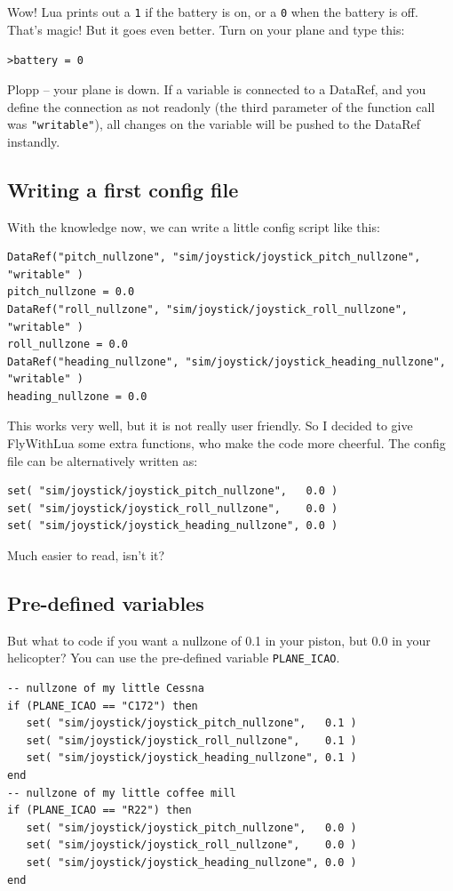 \documentclass[11pt,parskip=half,a4paper]{scrartcl}
\begin{document}
Wow! Lua prints out a \verb|1| if the battery is on, or a \verb|0| when the battery is off. That's magic! But it goes even better. Turn on your plane and type this:

\verb|>battery = 0|

Plopp -- your plane is down. If a variable is connected to a DataRef, and you define the connection as not readonly (the third parameter of the function call was \verb|"writable"|),
all changes on the variable will be pushed to the DataRef instandly.

\subsection{Writing a first config file}

With the knowledge now, we can write a little config script like this:

\begin{lstlisting}
DataRef("pitch_nullzone", "sim/joystick/joystick_pitch_nullzone", "writable" )
pitch_nullzone = 0.0
DataRef("roll_nullzone", "sim/joystick/joystick_roll_nullzone", "writable" )
roll_nullzone = 0.0
DataRef("heading_nullzone", "sim/joystick/joystick_heading_nullzone", "writable" )
heading_nullzone = 0.0
\end{lstlisting}

This works very well, but it is not really user friendly. So I decided to give FlyWithLua some extra functions, who make the code more cheerful. The config file can be alternatively written as:

\begin{lstlisting}
set( "sim/joystick/joystick_pitch_nullzone",   0.0 )
set( "sim/joystick/joystick_roll_nullzone",    0.0 )
set( "sim/joystick/joystick_heading_nullzone", 0.0 )
\end{lstlisting}

Much easier to read, isn't it?

\subsection{Pre-defined variables}

But what to code if you want a nullzone of 0.1 in your piston, but 0.0 in your helicopter? You can use the pre-defined variable \verb|PLANE_ICAO|.

\begin{lstlisting}
-- nullzone of my little Cessna
if (PLANE_ICAO == "C172") then
   set( "sim/joystick/joystick_pitch_nullzone",   0.1 )
   set( "sim/joystick/joystick_roll_nullzone",    0.1 )
   set( "sim/joystick/joystick_heading_nullzone", 0.1 )
end
-- nullzone of my little coffee mill
if (PLANE_ICAO == "R22") then
   set( "sim/joystick/joystick_pitch_nullzone",   0.0 )
   set( "sim/joystick/joystick_roll_nullzone",    0.0 )
   set( "sim/joystick/joystick_heading_nullzone", 0.0 )
end
\end{lstlisting}
\end{document}
